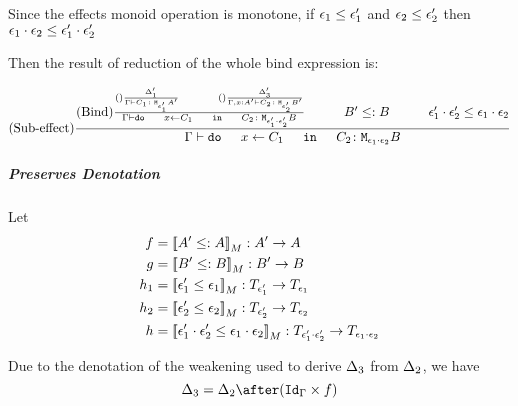 {                Since the effects monoid operation is monotone, if $\epsilon_1\leq\epsilon_1'$ and $\epsilon_2\leq\epsilon_2'$ then $\epsilon_1\cdot\epsilon_2 \leq \epsilon_1'\cdot\epsilon_2'$
                


                Then the result of reduction of the whole bind expression is:


                \begin{equation}
                    \treerule{Sub-effect}{
                        \treerule{Bind}{
                            \treerule{}{
                                \D'_1
                            }{
                                \gtyperelation{C_1}{\M{\e_1'}{A'}}
                            }
                            \s\s
                            \treerule{}{
                                \D'_3
                            }{
                                \typerelation{\G, x: A'}{C_2}{\M{\e_2'}{B'}}
                            }
                        }{
                        \gtyperelation{\doin{x}{C_1}{C_2}}{\M{\e_1'\dot\e_2'}{B}}
                        }
                        \s\s
                        B' \subtype B
                        \s\s
                        \e_1'\dot\e_2'\subeffect\e_1\dot\e_2
                    }{
                        \gtyperelation{\doin{x}{C_1}{C_2}}{\M{\e_1\dot\e_2}{B}}
                    }
                \end{equation}
                \subparagraph{Preserves Denotation}
                

                Let \begin{align}
                    f & = \deno{A' \subtype A}: A' \rightarrow A\\
                    g & = \deno{B' \subtype B}: B' \rightarrow B\\
                    h_1 & = \deno{\e_1' \subeffect \e_1} : \T{\e_1'}{} \rightarrow \T{\e_1}{} \\
                    h_2 & = \deno{\e_2'\subeffect \e_2}:\T{\e_2'}{} \rightarrow \T{\e_2}{}\\
                    h & = \deno{\e_1'\dot\e_2'\subeffect\e_1\dot\e_2}: \T{\e_1'\dot\e_2'}{}\rightarrow \T{\e_1\dot\e_2}{}
                \end{align}

                Due to the denotation of the weakening used to derive $\Delta_3$ from $\Delta_2$, we have 
                \begin{equation}
                    \D_3 = \D_2\after(\idg\times f)
                \end{equation}

}
